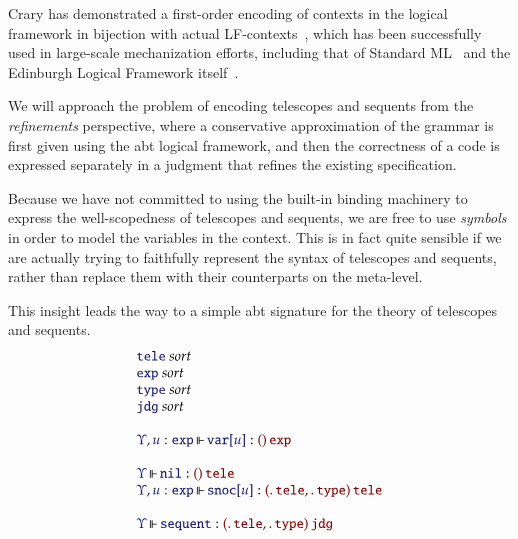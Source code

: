 \documentclass[11pt]{article}
\theoremstyle{definition}
\theoremstyle{remark}
\numberwithin{equation}{section}
\def\IModeColorName{MidnightBlue}
\def\OModeColorName{Maroon}
\newcommand\IMode[1]{{\color{\IModeColorName}{#1}}}
\newcommand\OMode[1]{{\color{\OModeColorName}{#1}}}
\newcommand\MkValence[3]{%
  \ifthenelse{\equal{#1}{}}{}{%
    \{#1\}%
  }%
  \ifthenelse{\equal{#2}{}}{}{%
    [#2]%
  }.\, #3%
}
\newcommand\MkArity[2]{(#1)\, #2}
\newcommand\IsSort[1]{\IMode{#1}\ \textit{sort}}
\newcommand\IsOperator[3]{
  \IMode{#1}\,{\Vdash}\,\IMode{#2}: \OMode{#3}
}
\begin{document}
Crary has demonstrated a first-order encoding of contexts in the logical
framework in bijection with actual LF-contexts~\cite{crary:2009}, which has
been successfully used in large-scale mechanization efforts, including that of
Standard ML~\cite{lee-crary-harper:2007} and the Edinburgh Logical Framework
itself~\cite{martens-crary:2012}.


We will approach the problem of encoding telescopes and sequents from the
\emph{refinements} perspective, where a conservative approximation of the
grammar is first given using the abt logical framework, and then the
correctness of a code is expressed separately in a judgment that refines the
existing specification.

Because we have not committed to using the built-in binding machinery to
express the well-scopedness of telescopes and sequents, we are free to use
\emph{symbols} in order to model the variables in the context. This is in fact
quite sensible if we are actually trying to faithfully represent the syntax of
telescopes and sequents, rather than replace them with their counterparts on
the meta-level.

This insight leads the way to a simple abt signature for the theory of telescopes
and sequents.
%
\newcommand\SortTele{\mathtt{tele}}
\newcommand\SortJdg{\mathtt{jdg}}
\newcommand\SortType{\mathtt{type}}
\newcommand\SortExpr{\mathtt{exp}}
\newcommand\OpNil{\mathtt{nil}}
\newcommand\OpSnoc[1]{\mathtt{snoc}[#1]}
\newcommand\OpVar[1]{\mathtt{var}[#1]}
\newcommand\OpSequent{\mathtt{sequent}}
%
\[
  \begin{array}{l}
    \IsSort{\SortTele}\\
    \IsSort{\SortExpr}\\
    \IsSort{\SortType}\\
    \IsSort{\SortJdg}\\\\
    \IsOperator{\Upsilon, u:\SortExpr}{\OpVar{u}}{
      \MkArity{}{\SortExpr}
    }\\\\
    \IsOperator{\Upsilon}{\OpNil}{
      \MkArity{}{\SortTele}
    }\\
    \IsOperator{\Upsilon, u:\SortExpr}{\OpSnoc{u}}{
      \MkArity{
        \MkValence{}{}{\SortTele},
        \MkValence{}{}{\SortType}
      }{\SortTele}
    }\\\\
    \IsOperator{\Upsilon}{\OpSequent}{
      \MkArity{
        \MkValence{}{}{\SortTele},
        \MkValence{}{}{\SortType}
      }{\SortJdg}
    }
  \end{array}
\]
\end{document}
